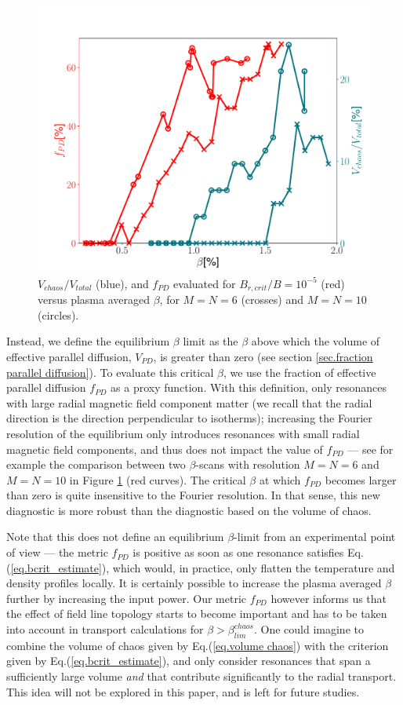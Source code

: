 \documentclass[my_thesis.tex]{subfiles}
\begin{document}
\begin{figure}
	\centering
	\includegraphics[width=0.75\linewidth]{images/ClassicalStellaratorBetaLimit/dBr_versus_Vchaos_convergence.pdf}
	\caption{$V_{chaos}/V_{total}$ (blue), and $f_{PD}$ evaluated for $ B_{r,crit}/B=10^{-5}$ (red) versus plasma averaged $\beta$, for $M=N=6$ (crosses) and $M=N=10$ (circles).}
	\label{fig. metrics convergence}
\end{figure}

Instead, we define the equilibrium $\beta$ limit as the $\beta$ above which the volume of effective parallel diffusion, $V_{PD}$, is greater than zero (see section \ref{sec.fraction parallel diffusion}). To evaluate this critical $\beta$, we use the fraction of effective parallel diffusion $f_{PD}$ as a proxy function. With this definition, only resonances with large radial magnetic field component matter (we recall that the radial direction is the direction perpendicular to isotherms); increasing the Fourier resolution of the equilibrium only introduces resonances with small radial magnetic field components, and thus does not impact the value of $f_{PD}$ --- see for example the comparison between two $\beta$-scans with resolution $M=N=6$ and $M=N=10$ in Figure \ref{fig. metrics convergence} (red curves). The critical $\beta$ at which $f_{PD}$ becomes larger than zero is quite insensitive to the Fourier resolution. In that sense, this new diagnostic is more robust than the diagnostic based on the volume of chaos.

Note that this does not define an equilibrium $\beta$-limit from an experimental point of view --- the metric $f_{PD}$ is positive as soon as one resonance satisfies Eq.(\ref{eq.bcrit_estimate}), which would, in practice, only flatten the temperature and density profiles locally. It is certainly possible to increase the plasma averaged $\beta$ further by increasing the input power. Our metric $f_{PD}$ however informs us that the effect of field line topology starts to become important and has to be taken into account in transport calculations for $\beta>\beta^{chaos}_{lim}$. One could imagine to combine the volume of chaos given by Eq.(\ref{eq.volume chaos}) with the criterion given by Eq.(\ref{eq.bcrit_estimate}), and only consider resonances that span a sufficiently large volume \emph{and} that contribute significantly to the radial transport. This idea will not be explored in this paper, and is left for future studies.	
\end{document}
